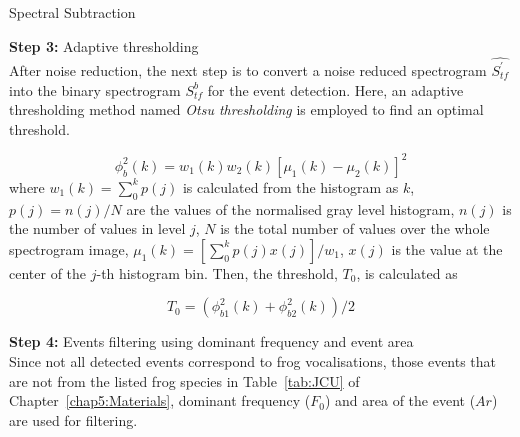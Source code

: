 \begin{algorithm}
\DontPrintSemicolon
{}

\caption{Spectral Subtraction\label{IR}}

\end{algorithm}

\noindent \textbf{Step 3:} Adaptive thresholding
\\
\noindent After noise reduction, the next step is to convert a noise reduced spectrogram $\hat{S^{'}_{tf}}$ into the binary spectrogram $S^{b}_{tf}$ for the event detection. Here, an adaptive thresholding method named \textit{Otsu thresholding} \citep{otsu1975threshold} is employed to find an optimal threshold.

\begin{equation}
\phi_{b}^{2}(k)=w_{1}(k)w_{2}(k)[\mu_{1}(k)-\mu_{2}(k)]^{2}
\end{equation}
\noindent where $w_{1}(k)=\sum_{0}^{k}p(j)$ is calculated from the histogram as $k$, $p(j)=n(j)/N$ are the values of the normalised gray level histogram, $n(j)$ is the number of values in level $j$, $N$ is the total number of values over the whole spectrogram image, $\mu_{1}(k)=[\sum_{0}^{k}p(j)x(j)]/w_{1}$, $x(j)$ is the value at the center of the $j$-th histogram bin. Then, the threshold, $T_{0}$, is calculated as

\begin{equation}
T_{0}= (\phi_{b1}^{2}(k) + \phi_{b2}^{2}(k)) / 2
\end{equation}


\noindent \textbf{Step 4:} Events filtering using dominant frequency and event area \\
Since not all detected events correspond to frog vocalisations, those events that are not from the listed frog species in Table~\ref{tab:JCU} of Chapter~\ref{chap5:Materials}, dominant frequency ($F_{0}$) and area of the event ($Ar$) are used for filtering.


